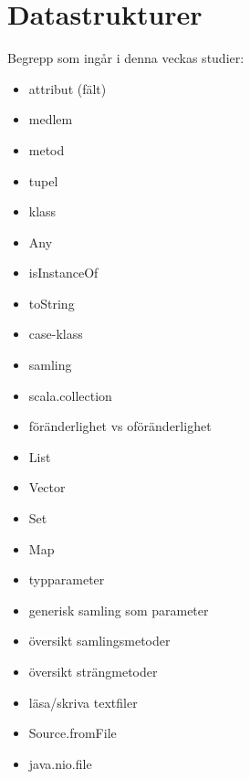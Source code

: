 \chapter{Datastrukturer}\label{chapter:W04}
Begrepp som ingår i denna veckas studier:
\begin{itemize}[noitemsep,label={$\square$},leftmargin=*]
\item attribut (fält)
\item medlem
\item metod
\item tupel
\item klass
\item Any
\item isInstanceOf
\item toString
\item case-klass
\item samling
\item scala.collection
\item föränderlighet vs oföränderlighet
\item List
\item Vector
\item Set
\item Map
\item typparameter
\item generisk samling som parameter
\item översikt samlingsmetoder
\item översikt strängmetoder
\item läsa/skriva textfiler
\item Source.fromFile
\item java.nio.file\end{itemize}
